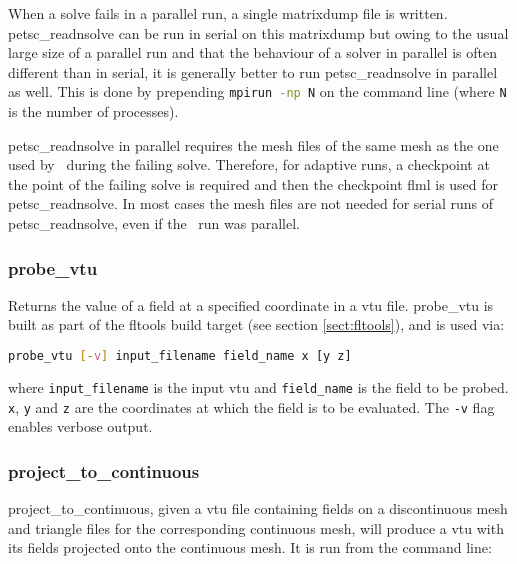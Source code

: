 When a solve fails in a parallel run, a single matrixdump file is written. petsc\_readnsolve can be run in serial on this matrixdump but owing to the usual large size of a parallel run and that the behaviour of a solver in parallel is often different than in serial, it is generally better to run petsc\_readnsolve in parallel as well. This is done by prepending \lstinline[language = Bash]+mpirun -np N+ on the command line (where \lstinline[language = Bash]+N+ is the number of processes).

petsc\_readnsolve in parallel requires the mesh files of the same mesh as the one used by \fluidity\ during the failing solve. Therefore, for adaptive runs, a checkpoint at the point of the failing solve is required and then the checkpoint flml is used for petsc\_readnsolve. In most cases the mesh files are not needed for serial runs of petsc\_readnsolve, even if the \fluidity\ run was parallel.


\subsubsection{probe\_vtu}
\label{sect:probe_vtu}

Returns the value of a field at a specified coordinate in a vtu file.
probe\_vtu is built as part of the fltools
build target (see section \ref{sect:fltools}), and is used via:

\begin{lstlisting}[language = Bash]
probe_vtu [-v] input_filename field_name x [y z]
\end{lstlisting}

where \lstinline[language = Bash]+input_filename+ is the input vtu and
\lstinline[language = Bash]+field_name+ is the field to be probed. 
\lstinline[language = Bash]+x+, \lstinline[language = Bash]+y+ and
\lstinline[language = Bash]+z+ are the coordinates at which the field is to
be evaluated. The \lstinline[language = Bash]+-v+ flag enables verbose output.


\subsubsection{project\_to\_continuous}
\label{sect:project_to_continuous}
project\_to\_continuous, given a vtu file containing fields on a discontinuous mesh and triangle files for the corresponding continuous mesh, will produce a vtu with its fields projected onto the continuous mesh. It is run from the command line:

